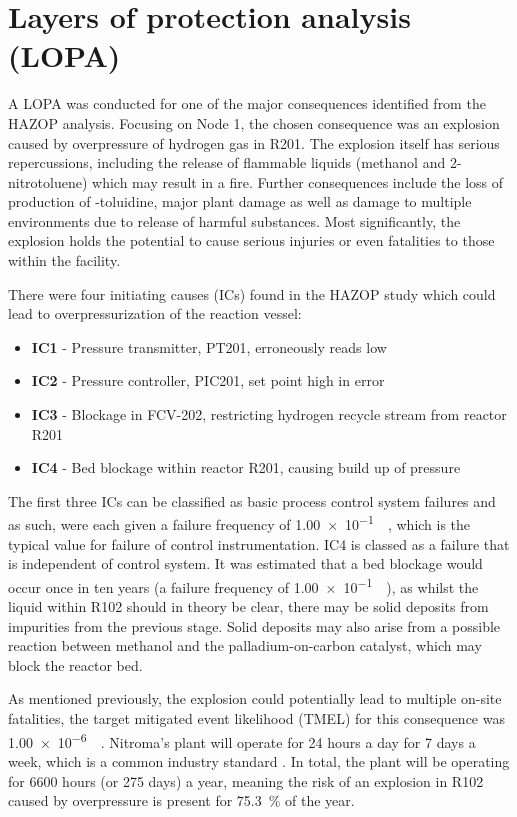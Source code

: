 \section{Layers of protection analysis (LOPA)}
\label{sec:LOPA}

A LOPA was conducted for one of the major consequences identified from the HAZOP analysis. Focusing on Node 1, the chosen consequence was an explosion caused by overpressure of hydrogen gas in R201. The explosion itself has serious repercussions, including the release of flammable liquids (methanol and 2-nitrotoluene) which may result in a fire. Further consequences include the loss of production of \ortho-toluidine, major plant damage as well as damage to multiple environments due to release of harmful substances. Most significantly, the explosion holds the potential to cause serious injuries or even fatalities to those within the facility. 

There were four initiating causes (ICs) found in the HAZOP study which could lead to overpressurization of the reaction vessel:

\begin{itemize}
\item \textbf{IC1} - Pressure transmitter, PT201, erroneously reads low 
\item \textbf{IC2} -  Pressure controller, PIC201, set point high in error
\item \textbf{IC3 }- Blockage in FCV-202, restricting hydrogen recycle stream from reactor R201 
\item \textbf{IC4} - Bed blockage within reactor R201, causing build up of pressure 
\end{itemize}

The first three ICs can be classified as basic process control system failures and as such, were each given a failure frequency of \SI{1.00e-1}{\per\year}, which is the typical value for failure of control instrumentation. IC4 is classed as a failure that is independent of control system. It was estimated that a bed blockage would occur once in ten years (a failure frequency of \SI{1.00e-1}{\per\year}), as whilst the liquid within R102 should in theory be clear, there may be solid deposits from impurities from the previous stage. Solid deposits may also arise from a possible reaction between methanol and the palladium-on-carbon catalyst, which may block the reactor bed. 

As mentioned previously, the explosion could potentially lead to multiple on-site fatalities, the target mitigated event likelihood (TMEL) for this consequence was  \SI{1.00e-6}{\per\year}. Nitroma's plant will operate for 24 hours a day for 7 days a week, which is a common industry standard \cite{job_guide_chemical_2021}. In total, the plant will be operating for 6600 hours (or 275 days) a year, meaning the risk of an explosion in R102 caused by overpressure is present for \SI{75.3}{\percent} of the year.  
 
